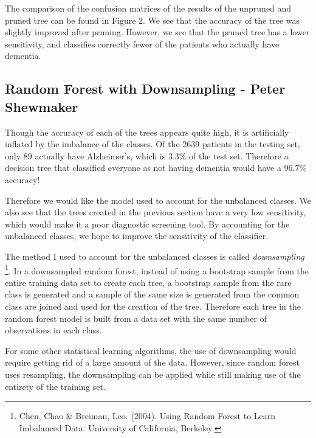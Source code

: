 \documentclass[a4paper,man,natbib,11pt]{article}
\begin{document}
The comparison of the confusion matrices of the results of the unpruned and pruned tree can be found in Figure 2. We see that the accuracy of the tree was slightly improved after pruning. However, we see that the pruned tree has a lower sensitivity, and classifies correctly fewer of the patients who actually have dementia. 

\subsection{Random Forest with Downsampling - Peter Shewmaker}

Though the accuracy of each of the trees appears quite high, it is artificially inflated by the imbalance of the classes. Of the 2639 patients in the testing set, only 89 actually have Alzheimer's, which is 3.3\% of the test set. Therefore a decision tree that classified everyone as not having dementia would have a 96.7\% accuracy! 

Therefore we would like the model used to account for the unbalanced classes. We also see that the trees created in the previous section have a very low sensitivity, which would make it a poor diagnostic screening tool. By accounting for the unbalanced classes, we hope to improve the sensitivity of the classifier.

The method I used to account for the unbalanced classes is called \textit{downsampling} \footnote{Chen, Chao & Breiman, Leo. (2004). Using Random Forest to Learn Imbalanced Data. University of California, Berkeley.}. In a downsampled random forest, instead of using a bootstrap sample from the entire training data set to create each tree, a bootstrap sample from the rare class is generated and a sample of the same size is generated from the common class are joined and used for the creation of the tree. Therefore each tree in the random forest model is built from a data set with the same number of observations in each class.

For some other statistical learning algorithms, the use of downsampling would require getting rid of a large amount of the data. However, since random forest uses resampling, the downsampling can be applied while still making use of the entirety of the training set.
\end{document}
